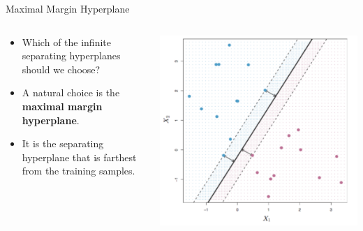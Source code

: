 \begin{frame}{Maximal Margin Hyperplane}
\begin{columns}
  \begin{column}{0.5\textwidth}
    \begin{itemize}
      \item Which of the infinite separating hyperplanes should we choose?
      \item A natural choice is the \textbf{maximal margin hyperplane}.
      \item It is the separating hyperplane that is farthest from the training samples.
    \end{itemize}
  \end{column}
  \begin{column}{0.5\textwidth}
    \centering
    \includegraphics[width=\linewidth]{images/support-vector-machines/support-vector-machines-8.png}
  \end{column}
\end{columns}
\end{frame}



